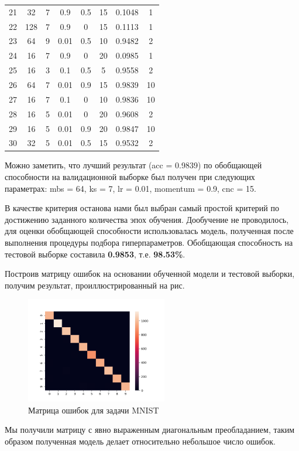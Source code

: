 \begin{textitemize}
\begin{table}[ht]
\begin{tabular}{c c c c c c c c}
		21       & 32  & 7  & 0.9   & 0.5      & 15  & 0.1048 & 1  \\
		22       & 128 & 7  & 0.9   & 0        & 15  & 0.1113 & 1  \\
		23       & 64  & 9  & 0.01  & 0.5      & 10  & 0.9482 & 2  \\
		24       & 16  & 7  & 0.9   & 0        & 20  & 0.0985 & 1  \\
		25       & 16  & 3  & 0.1   & 0.5      & 5   & 0.9558 & 2  \\
		26       & 64  & 7  & 0.01  & 0.9      & 15  & 0.9839 & 10 \\
		27       & 16  & 7  & 0.1   & 0        & 10  & 0.9836 & 10 \\
		28       & 16  & 5  & 0.01  & 0        & 20  & 0.9608 & 2  \\
		29       & 16  & 5  & 0.01  & 0.9      & 20  & 0.9847 & 10 \\
		30       & 32  & 5  & 0.01  & 0.5      & 15  & 0.9532 & 2  \\
		\hline
	\end{tabular}
	\label{table:nonlin}
\end{table}

Можно заметить, что лучший результат (acc = 0.9839) по обобщающей способности на валидационной выборке был получен при следующих параметрах: mbs = 64, ks = 7, lr = 0.01, momentum = 0.9, cnc = 15.


\item В качестве критерия останова нами был выбран самый простой критерий по достижению заданного количества эпох обучения. Дообучение не проводилось, для оценки обобщающей способности использовалась модель, полученная после выполнения процедуры подбора гиперпараметров. Обобщающая способность на тестовой выборке составила \textbf{0.9853}, т.е. \textbf{98.53\%}.


\item Построив матрицу ошибок на основании обученной модели и тестовой выборки, получим результат, проиллюстрированный на рис. 

\begin{figure}[h]
	\centering
	\includegraphics[width=0.55\textwidth]{author/part3/figures/conf_matrix_result.png}
	\caption{Матрица ошибок для задачи MNIST}
	\label{fig:conf_matrix_result}
\end{figure}

Мы получили матрицу с явно выраженным диагональным преобладанием, таким образом полученная модель делает относительно небольшое число ошибок.
\end{textitemize}

